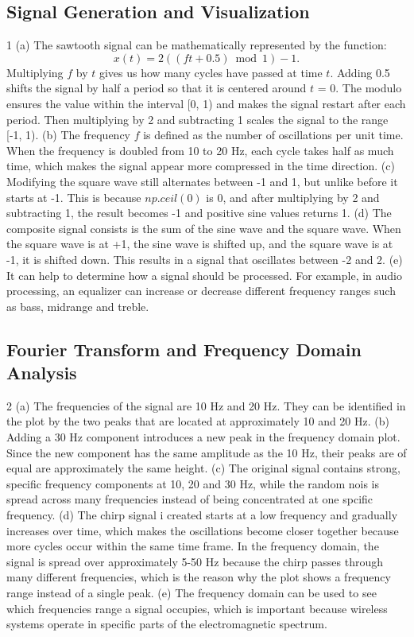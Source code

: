 \documentclass[11pt,a4paper]{article}
\begin{document}
\subsection{Signal Generation and Visualization}
1 (a)
The sawtooth signal can be mathematically represented by the function:
\[
x(t) = 2((ft + 0.5) \bmod 1) - 1.
\]
Multiplying \(f\) by \(t\) gives us how many cycles have passed at time \(t\). Adding 0.5 shifts the signal by half a period so that it is centered around \(t\) = 0. The modulo ensures the value within the interval [0, 1) and makes the signal restart after each period. Then multiplying by 2 and subtracting 1 scales the signal to the range [-1, 1).
 (b) The frequency \(f\) is defined as the number of oscillations per unit time. When the frequency is doubled from 10 to 20 Hz, each cycle takes half as much time, which makes the signal appear more compressed in the time direction.
 (c) Modifying the square wave still alternates between -1 and 1, but unlike before it starts at -1. This is because \(np.ceil(0)\) is 0, and after multiplying by 2 and subtracting 1, the result becomes -1 and positive sine values returns 1.
 (d) The composite signal consists is the sum of the sine wave and the square wave. When the square wave is at +1, the sine wave is shifted up, and the square wave is at -1, it is shifted down. This results in a signal that oscillates between -2 and 2.
 (e) It can help to determine how a signal should be processed. For example, in audio processing, an equalizer can increase or decrease different frequency ranges such as bass, midrange and treble.
\subsection{Fourier Transform and Frequency Domain Analysis}
2 (a) The frequencies of the signal are 10 Hz and 20 Hz. They can be identified in the plot by the two peaks that are located at approximately 10 and 20 Hz.
 (b) Adding a 30 Hz component introduces a new peak in the frequency domain plot. Since the new component has the same amplitude as the 10 Hz, their peaks are of equal are approximately the same height.
 (c) The original signal contains strong, specific frequency components at 10, 20 and 30 Hz, while the random nois is spread across many frequencies instead of being concentrated at one spcific frequency.
 (d) The chirp signal i created starts at a low frequency and gradually increases over time, which makes the oscillations become closer together because more cycles occur within the same time frame. In the frequency domain, the signal is spread over approximately 5-50 Hz because the chirp passes through many different frequencies, which is the reason why the plot shows a frequency range instead of a single peak.
(e) The frequency domain can be used to see which frequencies range a signal occupies, which is important because wireless systems operate in specific parts of the electromagnetic spectrum.
\end{document}
